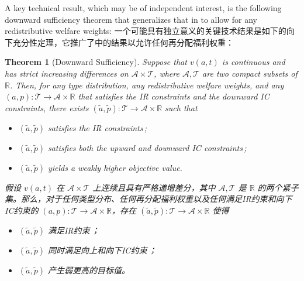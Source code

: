 \documentclass[12pt,letterpaper]{article}
\newenvironment{original}{\color{black}\noindent}{}
\newenvironment{translation}{\color{blue}\noindent}{}
\theoremstyle{plain}
\newtheorem{theorem}{Theorem}
\theoremstyle{definition}
\theoremstyle{remark}
\newcommand{\R}{\mathds{R}}
\renewcommand{\1}{\mathds{1}}
\theoremstyle{definition}
\begin{document}
\begin{original}
A key technical result, which may be of independent interest, is the following downward sufficiency theorem that generalizes that in \citet{yang2022costly} to allow for any redistributive welfare weights:
\end{original}
\begin{translation}
一个可能具有独立意义的关键技术结果是如下的向下充分性定理，它推广了\citet{yang2022costly}中的结果以允许任何再分配福利权重：
\end{translation}

\begin{theorem}[Downward Sufficiency]\label{thm:downward}
\begin{original}
Suppose that $v(a, t)$ is continuous and has strict increasing differences on $\mathcal{A} \times \mathcal{T}$, where $\mathcal{A}, \mathcal{T}$ are two compact subsets of $\R$. Then, for any type distribution, any redistributive welfare weights, and any $(a, p): \mathcal{T} \rightarrow \mathcal{A} \times \R$ that satisfies the IR constraints and the downward IC constraints, there exists $(\tilde{a}, \tilde{p}):  \mathcal{T} \rightarrow \mathcal{A} \times \R$ such that
\begin{itemize}
    \item[(i)] $(\tilde{a}, \tilde{p})$ satisfies the IR constraints\,;
    \item[(ii)] $(\tilde{a}, \tilde{p})$ satisfies both the upward and downward IC constraints\,;
    \item[(iii)]$(\tilde{a}, \tilde{p})$ yields a weakly higher objective value.
\end{itemize}
\end{original}
\begin{translation}
假设 $v(a, t)$ 在 $\mathcal{A} \times \mathcal{T}$ 上连续且具有严格递增差分，其中 $\mathcal{A}, \mathcal{T}$ 是 $\R$ 的两个紧子集。那么，对于任何类型分布、任何再分配福利权重以及任何满足IR约束和向下IC约束的 $(a, p): \mathcal{T} \rightarrow \mathcal{A} \times \R$，存在 $(\tilde{a}, \tilde{p}):  \mathcal{T} \rightarrow \mathcal{A} \times \R$ 使得
\begin{itemize}
    \item[(i)] $(\tilde{a}, \tilde{p})$ 满足IR约束\,；
    \item[(ii)] $(\tilde{a}, \tilde{p})$ 同时满足向上和向下IC约束\,；
    \item[(iii)] $(\tilde{a}, \tilde{p})$ 产生弱更高的目标值。
\end{itemize}
\end{translation}
\end{theorem}
\end{document}
